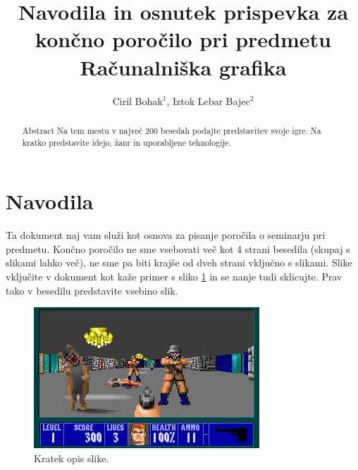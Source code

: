 \documentclass[a4paper]{article}
\begin{document}
\title{Navodila in osnutek prispevka za končno poročilo pri predmetu Računalniška grafika}

\author{Ciril Bohak$^{1}$, Iztok Lebar Bajec$^{2}$} %



\maketitle


\begin{abstract}{Abstract}
Na tem mestu v največ 200 besedah podajte predstavitev svoje igre. Na kratko predstavite idejo, žanr in {upo\-ra\-blje\-ne} tehnologije.
\end{abstract}

\section*{Navodila}
Ta dokument naj vam služi kot osnova za pisanje poročila o seminarju pri predmetu. Končno poročilo ne sme vsebovati več kot 4 strani besedila (skupaj s slikami lahko več), ne sme pa biti krajše od dveh strani vključno s slikami. Slike vključite v dokument kot kaže primer s sliko \ref{fig:slika} in se nanje tudi sklicujte. Prav tako v besedilu predstavite vsebino slik.

\begin{figure}[!htb]
    \begin{center}
        \includegraphics[width=\columnwidth]{wolfenstein.jpg}
        \caption{Kratek opis slike.} \label{fig:slika}
    \end{center}
\end{figure}
\end{document}
